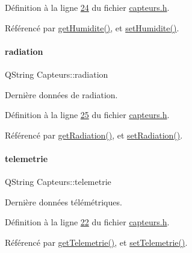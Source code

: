 Définition à la ligne \hyperlink{capteurs_8h_source_l00024}{24} du fichier \hyperlink{capteurs_8h_source}{capteurs.\+h}.



Référencé par \hyperlink{capteurs_8cpp_source_l00049}{get\+Humidite()}, et \hyperlink{capteurs_8cpp_source_l00029}{set\+Humidite()}.

\mbox{\label{class_capteurs_ad9d6f3fd6cc164c6cd5908fd7822f307}} 
\paragraph{\texorpdfstring{radiation}{radiation}}
{\footnotesize\ttfamily Q\+String Capteurs\+::radiation\hspace{0.3cm}{\ttfamily [private]}}



Dernière données de radiation. 



Définition à la ligne \hyperlink{capteurs_8h_source_l00025}{25} du fichier \hyperlink{capteurs_8h_source}{capteurs.\+h}.



Référencé par \hyperlink{capteurs_8cpp_source_l00054}{get\+Radiation()}, et \hyperlink{capteurs_8cpp_source_l00034}{set\+Radiation()}.

\mbox{\label{class_capteurs_a336a4c4ad6ae1a49d21b265d2953e24b}} 
\paragraph{\texorpdfstring{telemetrie}{telemetrie}}
{\footnotesize\ttfamily Q\+String Capteurs\+::telemetrie\hspace{0.3cm}{\ttfamily [private]}}



Dernière données télémétriques. 



Définition à la ligne \hyperlink{capteurs_8h_source_l00022}{22} du fichier \hyperlink{capteurs_8h_source}{capteurs.\+h}.



Référencé par \hyperlink{capteurs_8cpp_source_l00039}{get\+Telemetrie()}, et \hyperlink{capteurs_8cpp_source_l00019}{set\+Telemetrie()}.

